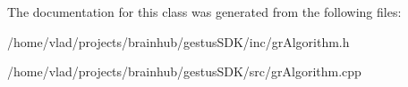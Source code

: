The documentation for this class was generated from the following files\+:\begin{DoxyCompactItemize}
\item 
/home/vlad/projects/brainhub/gestus\+S\+D\+K/inc/gr\+Algorithm.\+h\item 
/home/vlad/projects/brainhub/gestus\+S\+D\+K/src/gr\+Algorithm.\+cpp\end{DoxyCompactItemize}

